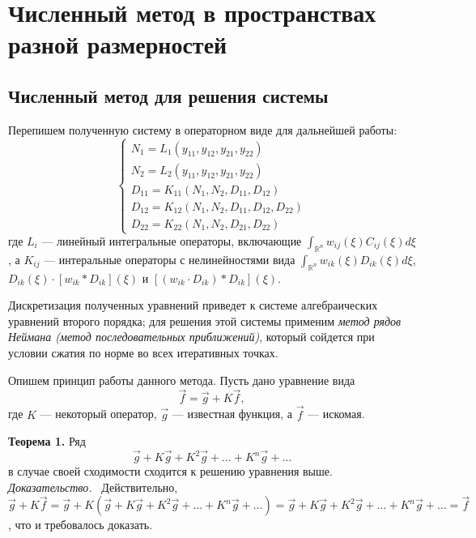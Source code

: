 \chapter{Численный метод в пространствах разной размерностей }

\section{Численный метод для решения системы}

Перепишем полученную систему в операторном виде для дальнейшей работы:
\begin{equation*}
\begin{cases}
	N_{1}=L_{1}(y_{11},y_{12},y_{21},y_{22})\\
	N_{2}=L_{2}(y_{11},y_{12},y_{21},y_{22})\\
	D_{11}=K_{11}(N_{1},N_{2},D_{11},D_{12})\\
	D_{12}=K_{12}(N_{1},N_{2},D_{11},D_{12},D_{22})\\
	D_{22}=K_{22}(N_{1},N_{2},D_{21},D_{22})
\end{cases}
\end{equation*}
где $L_i$ --- линейный интегральные операторы, включающие $ \int_{\mathbb{R}^n}w_{ij}(\xi)C_{ij}(\xi)d\xi$, а $K_{ij}$ --- интеральные операторы с нелинейностями вида $ \int_{\mathbb{R}^n}w_{ik}(\xi)D_{ik}(\xi)d\xi$, $D_{ik}(\xi)\cdot [w_{ik}*D_{ik}](\xi)$ и $[(w_{ik}\cdot D_{ik})*D_{ik}](\xi)$. 

Дискретизация полученных уравнений приведет к системе алгебраических уравнений второго порядка; для решения этой системы применим \textit{метод рядов Неймана (метод последовательных приближений)}, который сойдется при условии сжатия по норме во всех итеративных точках. 

Опишем принцип работы данного метода. Пусть дано уравнение вида \begin{equation*}
\vec{f}=\vec{g}+K\vec{f},
\end{equation*}
где $K$ --- некоторый оператор, $\vec{g}$ --- известная функция, а $\vec{f}$ --- искомая.

\textbf{Теорема 1.} Ряд 
\begin{equation*}
	\vec{g}+K\vec{g}+K^2\vec{g}+\ldots+K^n\vec{g}+\ldots
\end{equation*}
	в случае своей сходимости сходится к решению уравнения выше.\\
\textit{Доказательство. }\ Действительно, $\vec{g}+K\vec{f}=\vec{g}+K(\vec{g}+K\vec{g}+K^2\vec{g}+\ldots+K^n\vec{g}+\ldots)=\vec{g}+K\vec{g}+K^2\vec{g}+\ldots+K^n\vec{g}+\ldots=\vec{f}$, что и требовалось доказать.

